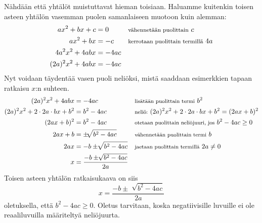 Nähdään että yhtälöt muistuttavat hieman toisiaan. Haluamme kuitenkin toisen asteen yhtälön vasemman puolen samanlaiseen muotoon kuin alemman:
\begin{align*}
ax^2+bx+c&=0 &&\textnormal{\footnotesize{vähennetään puolittain}} \ c \\
ax^2+bx &= -c &&\textnormal{\footnotesize{kerrotaan puolittain termillä}} \ 4a\\
4a^2 x^2 + 4abx &= -4ac \\
(2a)^2 x^2 +4abx &= -4ac 
\end{align*}
Nyt voidaan täydentää vasen puoli neliöksi, mistä saaddaan esimerkkien tapaan ratkaisu $x$:n suhteen.
\begin{align*}
(2a)^2 x^2 +4abx &=-4ac &&\textnormal{\footnotesize{lisätään puolittain termi}} \ b^2 \\
(2a)^2 x^2 +2\cdot 2a\cdot bx +b^2&=b^2-4ac &&\textnormal{\footnotesize{neliö:}} \ (2a)^2 x^2 +2\cdot 2a\cdot bx+b^2=(2ax+b)^2 \\
(2ax+b)^2&=b^2-4ac &&\textnormal{\footnotesize{otetaan puolittain neliöjuuri, jos}} \ b^2 -4ac \geq 0 \\
2ax+b&= \pm \sqrt[]{b^2-4ac} &&\textnormal{\footnotesize{vähennetään puolittain termi}} \ b \\
2ax&=-b \pm \sqrt[]{b^2-4ac} &&\textnormal{\footnotesize{jaetaan puolittain termillä}} \ 2a \neq 0 \\
x&= \frac{-b \pm \sqrt[]{b^2-4ac}}{2a}
\end{align*}
Toisen asteen yhtälön ratkaisukaava on siis \[x= \frac{-b \pm \sqrt[]{b^2-4ac}}{2a}\] oletuksella, että $b^2-4ac \geq 0$. Oletus tarvitaan, koska negatiivisille luvuille ei ole reaaliluvuilla määriteltyä neliöjuurta.\\
